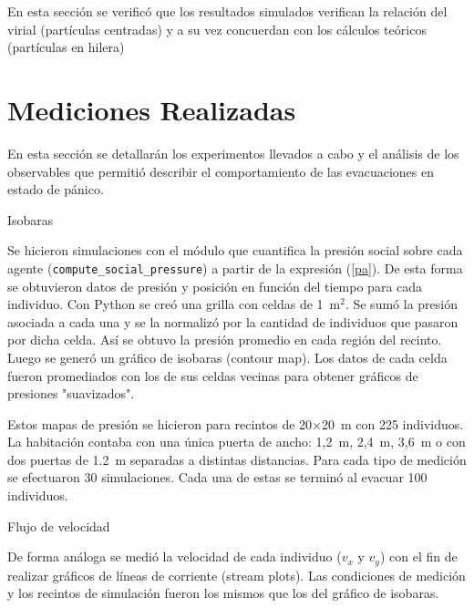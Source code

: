 En esta sección se verificó que los resultados simulados verifican la relación del virial (partículas centradas) y a su vez concuerdan con los cálculos teóricos (partículas en hilera)


\section{\label{med realizadas} Mediciones Realizadas}

En esta sección se detallarán los experimentos llevados a cabo y el análisis de los observables que permitió describir el comportamiento de las evacuaciones en estado de pánico. 

{\Large Isobaras}

Se hicieron simulaciones con el módulo que cuantifica la presión social sobre cada agente ({\tt compute\_social\_pressure}) a partir de la expresión (\ref{pa}). De esta forma se obtuvieron datos de presión y posición en función del tiempo para cada individuo. Con Python se creó una grilla con celdas de 1~m$^2$. Se sumó la presión asociada a cada una y se la normalizó por la cantidad de individuos que pasaron por dicha celda. Así se obtuvo la presión promedio en cada región del recinto. Luego se generó un gráfico de isobaras (contour map). Los datos de cada celda fueron promediados con los de sus celdas vecinas para obtener gráficos de presiones "suavizados".


Estos mapas de presión se hicieron para recintos de 20$\times$20~m con 225 individuos. La habitación contaba con una única puerta de ancho: 1,2~m, 2,4~m, 3,6~m o con dos puertas de 1.2~m separadas a distintas distancias. Para cada tipo de medición se efectuaron 30 simulaciones. Cada una de estas se terminó al evacuar 100 individuos. 

{\Large Flujo de velocidad}

De forma análoga se medió la velocidad de cada individuo ($v_x$ y $v_y$) con el fin de realizar gráficos de líneas de corriente (stream plots). Las condiciones de medición y los recintos de simulación fueron los mismos que los del gráfico de isobaras. 

